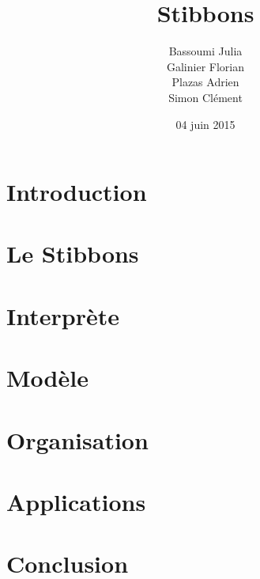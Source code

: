 \documentclass[11pt,handout]{beamer}
\title{Stibbons}
\author{Bassoumi Julia \\ Galinier Florian \\ Plazas Adrien \\ Simon Clément}
\date{04 juin 2015}
\begin{document}
\begin{frame}
\titlepage
\end{frame}

\begin{frame}
\tableofcontents
\end{frame}

\section{Introduction}


\section{Le Stibbons}

 
\section{Interprète}


\section{Modèle}


\section{Organisation}


\section{Applications}


\section{Conclusion}

\end{document}
